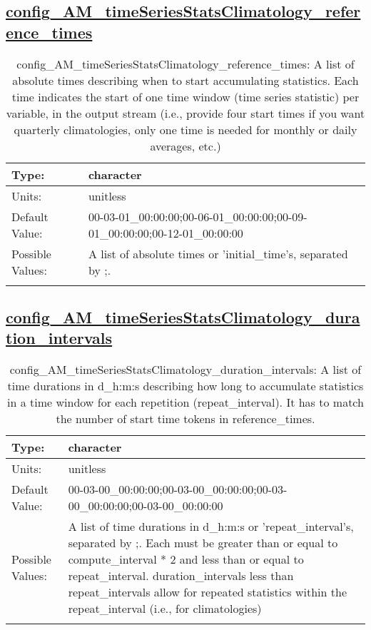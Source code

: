 \subsection[config\_AM\_timeSeriesStatsClimatology\_reference\_times]{\hyperref[sec:nm_tab_AM_timeSeriesStatsClimatology]{config\_AM\_timeSeriesStatsClimatology\_reference\_times}}
\label{subsec:nm_sec_config_AM_timeSeriesStatsClimatology_reference_times}
\begin{center}
\begin{longtable}{| p{2.0in} || p{4.0in} |}
    \hline
    Type: & character \\
    \hline
    Units: & \si{unitless} \\
    \hline
    Default Value: & 00-03-01\_00:00:00;00-06-01\_00:00:00;00-09-01\_00:00:00;00-12-01\_00:00:00 \\
    \hline
    Possible Values: & A list of absolute times or 'initial\_time's, separated by ;. \\
    \hline
    \caption{config\_AM\_timeSeriesStatsClimatology\_reference\_times: A list of absolute times describing when to start accumulating statistics. Each time indicates the start of one time window (time series statistic) per variable, in the output stream (i.e., provide four start times if you want quarterly climatologies, only one time is needed for monthly or daily averages, etc.)}
\end{longtable}
\end{center}
\subsection[config\_AM\_timeSeriesStatsClimatology\_duration\_intervals]{\hyperref[sec:nm_tab_AM_timeSeriesStatsClimatology]{config\_AM\_timeSeriesStatsClimatology\_duration\_intervals}}
\label{subsec:nm_sec_config_AM_timeSeriesStatsClimatology_duration_intervals}
\begin{center}
\begin{longtable}{| p{2.0in} || p{4.0in} |}
    \hline
    Type: & character \\
    \hline
    Units: & \si{unitless} \\
    \hline
    Default Value: & 00-03-00\_00:00:00;00-03-00\_00:00:00;00-03-00\_00:00:00;00-03-00\_00:00:00 \\
    \hline
    Possible Values: & A list of time durations in d\_h:m:s or 'repeat\_interval's, separated by ;. Each must be greater than or equal to compute\_interval * 2 and less than or equal to repeat\_interval. duration\_intervals less than repeat\_intervals allow for repeated statistics within the repeat\_interval (i.e., for climatologies) \\
    \hline
    \caption{config\_AM\_timeSeriesStatsClimatology\_duration\_intervals: A list of time durations in d\_h:m:s describing how long to accumulate statistics in a time window for each repetition (repeat\_interval). It has to match the number of start time tokens in reference\_times.}
\end{longtable}
\end{center}

